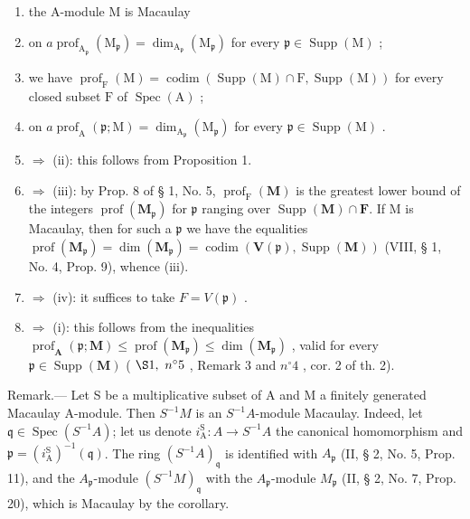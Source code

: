 \begin{enumerate}
\def\labelenumi{(\roman{enumi})}
\item
  the A-module M is Macaulay
\item
  on \(a \operatorname{prof}_{\mathrm{A}_{\mathfrak{p}}}(\mathrm{M}_{\mathfrak{p}}) = \dim_{\mathrm{A}_{\mathfrak{p}}}(\mathrm{M}_{\mathfrak{p}})\) for every \(\mathfrak{p} \in \operatorname{Supp}(\mathrm{M})\) ;
\item
  we have \(\operatorname{prof}_{\mathrm{F}}(\mathrm{M}) = \operatorname{codim}(\operatorname{Supp}(\mathrm{M}) \cap \mathrm{F}, \operatorname{Supp}(\mathrm{M}))\) for every closed subset \(\mathrm{F}\) of \(\operatorname{Spec}(\mathrm{A})\) ;
\item
  on \(a \operatorname{prof}_{\mathrm{A}}(\mathfrak{p}; \mathrm{M}) = \dim_{\mathrm{A}_{\mathfrak{p}}}(\mathrm{M}_{\mathfrak{p}})\) for every \(\mathfrak{p} \in \operatorname{Supp}(\mathrm{M})\) .
\item
  \(\Rightarrow\) (ii): this follows from Proposition 1.
\item
  \(\Rightarrow\) (iii): by Prop. 8 of § 1, No. 5, \(\operatorname{prof}_{\mathrm{F}}(\mathbf{M})\) is the greatest lower bound of the integers \(\operatorname{prof}(\mathbf{M}_{\mathfrak{p}})\) for \(\mathfrak{p}\) ranging over \(\operatorname{Supp}(\mathbf{M}) \cap \mathbf{F}\). If M is Macaulay, then for such a \(\mathfrak{p}\) we have the equalities \(\operatorname{prof}(\mathbf{M}_{\mathfrak{p}}) = \dim(\mathbf{M}_{\mathfrak{p}}) = \operatorname{codim}(\mathbf{V}(\mathfrak{p}), \operatorname{Supp}(\mathbf{M}))\) (VIII, § 1, No. 4, Prop. 9), whence (iii).
\item
  \(\Rightarrow\) (iv): it suffices to take \(F = V(\mathfrak{p})\) .
\item
  \(\Rightarrow\) (i): this follows from the inequalities \(\operatorname{prof}_{\mathbf{A}}(\mathfrak{p};\mathbf{M})\leqslant\operatorname{prof}(\mathbf{M}_{\mathfrak{p}})\leqslant\dim(\mathbf{M}_{\mathfrak{p}})\) , valid for every \(\mathfrak{p}\in\operatorname{Supp}(\mathbf{M})\) ( \(\S 1,\ n^{\circ}5\) , Remark 3 and \(n^{\circ}4\) , cor. 2 of th. 2).
\end{enumerate}

Remark.--- Let S be a multiplicative subset of A and M a finitely generated Macaulay A-module. Then \(S^{-1}M\) is an \(S^{-1}A\)-module Macaulay. Indeed, let \(\mathfrak{q} \in \operatorname{Spec}(S^{-1}A)\); let us denote \(i_{\mathrm{A}}^{\mathrm{S}} : A \to S^{-1}A\) the canonical homomorphism and \(\mathfrak{p} = (i_{\mathrm{A}}^{\mathrm{S}})^{-1}(\mathfrak{q})\). The ring \((S^{-1}A)_{\mathfrak{q}}\) is identified with \(A_{\mathfrak{p}}\) (II, § 2, No. 5, Prop. 11), and the \(A_{\mathfrak{p}}\)-module \((S^{-1}M)_{\mathfrak{q}}\) with the \(A_{\mathfrak{p}}\)-module \(M_{\mathfrak{p}}\) (II, § 2, No. 7, Prop. 20), which is Macaulay by the corollary.

